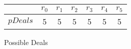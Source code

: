 \begin{minipage}{0.5\linewidth}
  \begin{tabular}{ | c || c | c | c | c | c | c  | } 
    \hline$\;$   & $r_{0}$ & $r_{1}$ & $r_{2}$ & $r_{3}$ & $r_{4}$ & $r_{5}$ \\ 
    \hline 
    $pDeals$ & 5  & 5  & 5  & 5  & 5  & 5  \\ 
    \hline 
  \end{tabular}
  \caption{Possible Deals}
  \label{pDeals-0}
\end{minipage}

